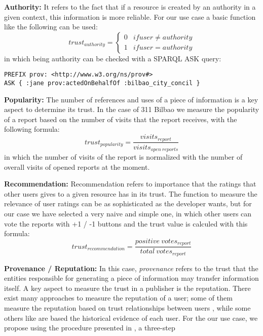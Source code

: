 \textbf{Authority:} It refers to the fact that if a resource is created by an authority in a given context, this information is more reliable. For our use case a basic function like the following can be used:
%
\begin{equation}
	trust_{authority} = \left\{\begin{matrix}
	0 & if user \neq authority \\
	1 & if user = authority
	\end{matrix}\right.
\end{equation}
%
in which being authority can be checked with a SPARQL ASK query:
%
\lstset{numbers=left, basicstyle=\ttfamily\scriptsize,}
\begin{lstlisting}
PREFIX prov: <http://www.w3.org/ns/prov#>
ASK { :jane prov:actedOnBehalfOf :bilbao_city_concil }
\end{lstlisting}
%

\textbf{Popularity:} The number of references and uses of a piece of information is a key aspect to determine its trust. In the case of 311 Bilbao we measure the popularity of a report based on the number of visits that the report receives, with the following formula:
%
\begin{equation}
    trust_{popularity} = \frac{visits_{report}}{visits_{open\ reports}}
\end{equation}
%
in which the number of visits of the report is normalized with the number of overall visits of opened reports at the moment.

\textbf{Recommendation:} Recommendation refers to importance that the ratings that other users gives to a given resource has in its trust. The function to measure the relevance of user ratings can be as sophisticated as the developer wants, but for our case we have selected a very naive and simple one, in which other users can vote the reports with +1 / -1 buttons and the trust value is calculed with this formula:
%
\begin{equation}
    trust_{recommendation} = \frac{positive\ votes_{report}}{total\ votes_{report}}
\end{equation}
%

\textbf{Provenance / Reputation:} In this case, \textit{provenance} refers to the trust that the entities responsible for generating a piece of information may transfer information itself. A key aspect to measure the trust in a publisher is the reputation. There exist many approaches to measure the reputation of a user; some of them measure the reputation based on trust relationships between users \cite{golbeck2006combining}, while some others like \cite{CeolinGHNF12} are based the historical evidence of each user. For the our use case, we propose using the procedure presented in \cite{CeolinGHNF12}, a three-step 

